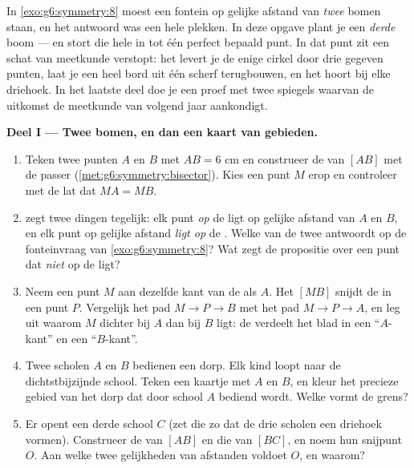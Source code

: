 \begin{problem}
\label{pb:g6:symmetry:1}
In \cref{exo:g6:symmetry:8} moest een fontein op gelijke afstand van
\emph{twee} bomen staan, en het antwoord was een hele  plekken. In deze
opgave plant je een \emph{derde} boom --- en stort die hele  in tot één
perfect bepaald punt. In dat punt zit een schat van meetkunde verstopt: het
levert je de enige cirkel door drie gegeven punten, laat je een heel bord uit één
scherf terugbouwen, en het hoort bij elke driehoek. In het laatste deel doe je
een proef met twee spiegels waarvan de uitkomst de meetkunde van volgend jaar
aankondigt.

\medskip
\noindent\textbf{Deel I --- Twee bomen, en dan een kaart van gebieden.}
\begin{enumerate}
  \item Teken twee punten $A$ en $B$ met $AB = 6$ cm en construeer de
         van $[AB]$ met de passer
        (\cref{met:g6:symmetry:bisector}). Kies een punt $M$ erop en controleer
        met de lat dat $MA = MB$.
  \item {} zegt twee dingen tegelijk: elk punt
        \emph{op} de  ligt op gelijke afstand van $A$ en $B$, en
        elk punt op gelijke afstand \emph{ligt op} de . Welke van
        de twee antwoordt op de fonteinvraag van \cref{exo:g6:symmetry:8}? Wat
        zegt de propositie over een punt dat \emph{niet} op de 
        ligt?
  \item Neem een punt $M$ aan dezelfde kant van de  als $A$. Het
         $[MB]$ snijdt de  in een punt $P$. Vergelijk het
        pad $M \to P \to B$ met het pad $M \to P \to A$, en leg uit waarom $M$
        dichter bij $A$ dan bij $B$ ligt: de  verdeelt het blad in
        een ``$A$-kant'' en een ``$B$-kant''.
  \item Twee scholen $A$ en $B$ bedienen een dorp. Elk kind loopt naar de
        dichtstbijzijnde school. Teken een kaartje met $A$ en $B$, en kleur het
        precieze gebied van het dorp dat door school $A$ bediend wordt. Welke
         vormt de grens?
  \item Er opent een derde school $C$ (zet die zo dat de drie scholen een
        driehoek vormen). Construeer de  van $[AB]$ en die van
        $[BC]$, en noem hun snijpunt $O$. Aan welke twee gelijkheden van
        afstanden voldoet $O$, en waarom?
\end{enumerate}


\end{problem}
